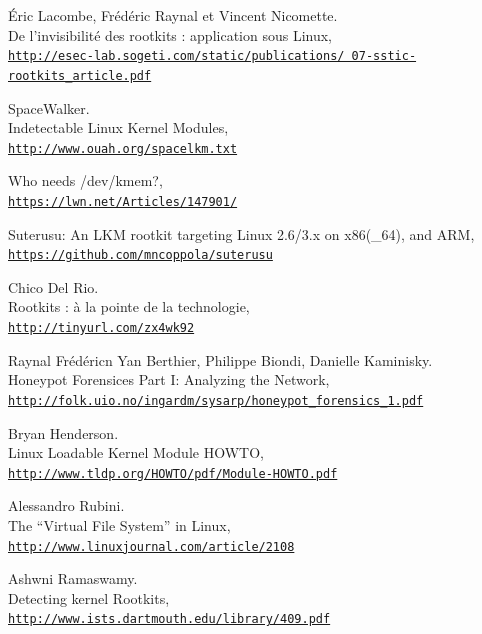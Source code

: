 \documentclass[12pt]{article}
\begin{document}
\begin{thebibliography}{22}
Éric Lacombe, Frédéric Raynal et Vincent Nicomette.\\
De l’invisibilité des rootkits : application sous Linux,
\\\href{http://esec-lab.sogeti.com/static/publications/07-sstic-rootkits\_article.pdf}{\texttt{http://esec-lab.sogeti.com/static/publications/
07-sstic-rootkits\_article.pdf}}

SpaceWalker.\\
Indetectable Linux Kernel Modules,
\\\href{http://www.ouah.org/spacelkm.txt}{\texttt{http://www.ouah.org/spacelkm.txt}}

Who needs /dev/kmem?,
\\\href{https://lwn.net/Articles/147901/}{\texttt{https://lwn.net/Articles/147901/}}

Suterusu: An LKM rootkit targeting Linux 2.6/3.x on x86(\_64), and ARM,
\\\href{https://github.com/mncoppola/suterusu}{\texttt{https://github.com/mncoppola/suterusu}}

Chico Del Rio.\\
Rootkits : à la pointe de la technologie,
\\\href{http://tinyurl.com/zx4wk92}{\texttt{http://tinyurl.com/zx4wk92}}

Raynal Frédéricn Yan Berthier, Philippe Biondi, Danielle Kaminisky.\\
Honeypot Forensices Part I: Analyzing the Network,
\\\href{http://folk.uio.no/ingardm/sysarp/honeypot\_forensics\_1.pdf}{\texttt{http://folk.uio.no/ingardm/sysarp/honeypot\_forensics\_1.pdf}}

Bryan Henderson.\\
Linux Loadable Kernel Module HOWTO,
\\\href{http://www.tldp.org/HOWTO/pdf/Module-HOWTO.pdf}{\texttt{http://www.tldp.org/HOWTO/pdf/Module-HOWTO.pdf}}

Alessandro Rubini.\\
The “Virtual File System” in Linux,
\\\href{http://www.linuxjournal.com/article/2108}{\texttt{http://www.linuxjournal.com/article/2108}}

Ashwni Ramaswamy.\\
Detecting kernel Rootkits,
\\\href{http://www.ists.dartmouth.edu/library/409.pdf}{\texttt{http://www.ists.dartmouth.edu/library/409.pdf}}


\end{thebibliography}
\end{document}
